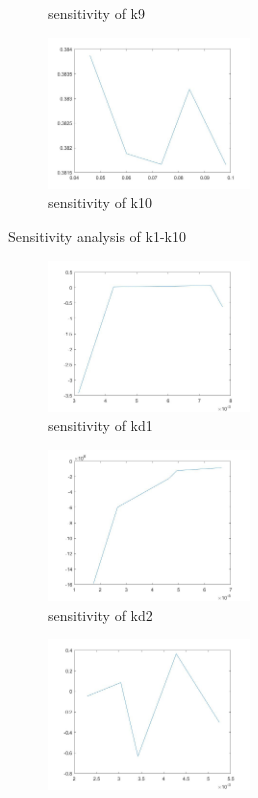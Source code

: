\begin{figure}[H]
\begin{subfigure}{0.5\textwidth}
		\caption{sensitivity of k9}
	\end{subfigure}%
	\begin{subfigure}{0.5\textwidth}
		\includegraphics[height=4cm]{s10.jpg}
		\caption{sensitivity of k10}
	\end{subfigure}
	\caption{Sensitivity analysis of k1-k10}
\end{figure}

\begin{figure}[H]
	\begin{subfigure}{0.5\textwidth}
		\includegraphics[height=4cm]{sd1.jpg}
		\caption{sensitivity of kd1}
	\end{subfigure}%
	\begin{subfigure}{0.5\textwidth}
		\includegraphics[height=4cm]{sd2.jpg}
		\caption{sensitivity of kd2}
	\end{subfigure}
	\begin{subfigure}{0.5\textwidth}
		\includegraphics[height=4cm]{sd3.jpg}

\end{subfigure}
\end{figure}
